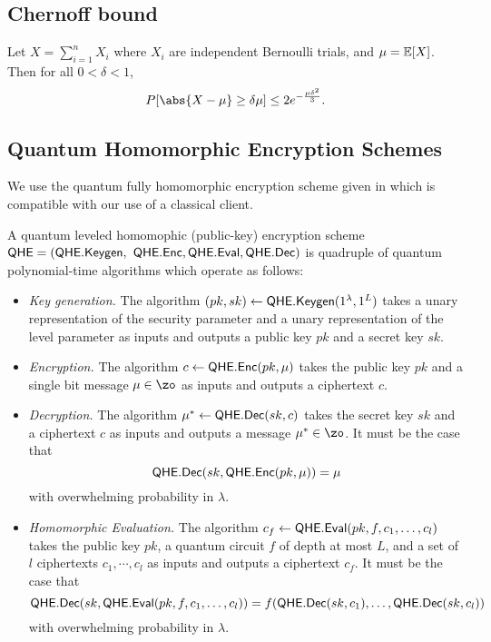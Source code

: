 \fi

\subsection{Chernoff bound}

\begin{thm}
\label{thm:Chernoff}
Let $X=\sum_{i=1}^n X_i$ where $X_i$ are independent Bernoulli trials, and $\mu=\operatorname*{\mathbb{E}}[X]$.
Then for all $0<\delta<1$,
$$P[\abs{X-\mu}\geq\delta\mu]\leq2e^{-\frac{\mu\delta^2}{3}}.$$
\end{thm}

\subsection{Quantum Homomorphic Encryption Schemes}

We use the quantum fully homomorphic encryption scheme given in \cite{mahadev_qfhe} which is compatible with our use of a classical client.
\begin{definition}
	A quantum leveled homomophic (public-key) encryption scheme $\mathsf{QHE}=(\mathsf{QHE.Keygen},$ \linebreak
	$\mathsf{QHE.Enc}, \mathsf{QHE.Eval}, \mathsf{QHE.Dec})$ is quadruple of quantum polynomial-time algorithms which operate as follows:
	\begin{itemize}
		\item \emph{Key generation.}
			The algorithm $(pk, sk)\leftarrow\mathsf{QHE.Keygen}(1^\lambda, 1^L)$ takes a unary representation of the security parameter and a unary representation of the level parameter as inputs and outputs a public key $pk$ and a secret key $sk$.
		\item \emph{Encryption.}
			The algorithm $c\leftarrow\mathsf{QHE.Enc}(pk, \mu)$ takes the public key $pk$ and a single bit message $\mu\in\zo$ as inputs and outputs a ciphertext $c$.
		\item \emph{Decryption.}
			The algorithm $\mu^*\leftarrow\mathsf{QHE.Dec}(sk, c)$ takes the secret key $sk$ and a ciphertext $c$ as inputs and outputs a message $\mu^*\in\zo$.
			It must be the case that
				$$\mathsf{QHE.Dec}(sk, \mathsf{QHE.Enc}(pk, \mu))=\mu$$
			with overwhelming probability in $\lambda$.
		\item \emph{Homomorphic Evaluation.}
			The algorithm $c_f\leftarrow\mathsf{QHE.Eval}(pk, f, c_1, \ldots, c_l)$ takes the public key $pk$, a quantum circuit $f$ of depth at most $L$, and a set of $l$ ciphertexts $c_1,\cdots,c_l$ as inputs and outputs a ciphertext $c_f$.
			It must be the case that
				$$\mathsf{QHE.Dec}(sk, \mathsf{QHE.Eval}(pk, f, c_1, \ldots, c_l))=f(\mathsf{QHE.Dec}(sk, c_1),\ldots,\mathsf{QHE.Dec}(sk, c_l))$$
			with overwhelming probability in $\lambda$.
	\end{itemize}
\end{definition}

